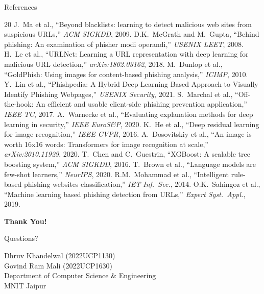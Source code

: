 \documentclass[aspectratio=169,12pt]{beamer}
\begin{document}
\begin{frame}[allowframebreaks]{References}
    \tiny
    \begin{thebibliography}{20}
         J.\ Ma et al., ``Beyond blacklists: learning to detect malicious web sites from suspicious URLs,'' \textit{ACM SIGKDD}, 2009.
         D.K.\ McGrath and M.\ Gupta, ``Behind phishing: An examination of phisher modi operandi,'' \textit{USENIX LEET}, 2008.
         H.\ Le et al., ``URLNet: Learning a URL representation with deep learning for malicious URL detection,'' \textit{arXiv:1802.03162}, 2018.
         M.\ Dunlop et al., ``GoldPhish: Using images for content-based phishing analysis,'' \textit{ICIMP}, 2010.
         Y.\ Lin et al., ``Phishpedia: A Hybrid Deep Learning Based Approach to Visually Identify Phishing Webpages,'' \textit{USENIX Security}, 2021.
         S.\ Marchal et al., ``Off-the-hook: An efficient and usable client-side phishing prevention application,'' \textit{IEEE TC}, 2017.
         A.\ Warnecke et al., ``Evaluating explanation methods for deep learning in security,'' \textit{IEEE EuroS\&P}, 2020.
         K.\ He et al., ``Deep residual learning for image recognition,'' \textit{IEEE CVPR}, 2016.
         A.\ Dosovitskiy et al., ``An image is worth 16x16 words: Transformers for image recognition at scale,'' \textit{arXiv:2010.11929}, 2020.
         T.\ Chen and C.\ Guestrin, ``XGBoost: A scalable tree boosting system,'' \textit{ACM SIGKDD}, 2016.
         T.\ Brown et al., ``Language models are few-shot learners,'' \textit{NeurIPS}, 2020.
         R.M.\ Mohammad et al., ``Intelligent rule-based phishing websites classification,'' \textit{IET Inf.\ Sec.}, 2014.
         O.K.\ Sahingoz et al., ``Machine learning based phishing detection from URLs,'' \textit{Expert Syst.\ Appl.}, 2019.
    \end{thebibliography}
\end{frame}

\begin{frame}[plain]
    \begin{center}
        \vspace{2cm}
        {\Huge\bfseries\color{mnit} Thank You!}
        \vspace{1cm}
        
        {\Large Questions?}
        \vspace{1.5cm}
        
        {\normalsize
        Dhruv Khandelwal (2022UCP1130)\\
        Govind Ram Mali (2022UCP1630)\\[0.5cm]
        Department of Computer Science \& Engineering\\
        MNIT Jaipur}
    \end{center}
\end{frame}
\end{document}
